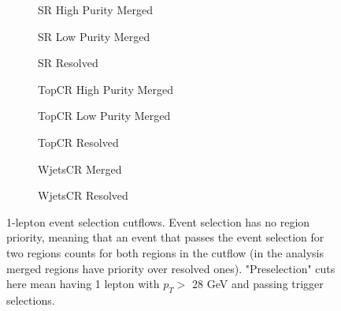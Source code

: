 \begin{figure}[ht]
    \centering
    \begin{subfigure}{\textwidth}
        \resizebox{\textwidth}{!}{}
        \caption{SR High Purity Merged}
    \end{subfigure}
    \begin{subfigure}{\textwidth}
        \resizebox{\textwidth}{!}{}
        \caption{SR Low Purity Merged}
    \end{subfigure}
    \begin{subfigure}{\textwidth}
        \resizebox{\textwidth}{!}{}
        \caption{SR Resolved}
    \end{subfigure}
    \begin{subfigure}{\textwidth}
        \resizebox{\textwidth}{!}{}
        \caption{TopCR High Purity Merged}
    \end{subfigure}
    \begin{subfigure}{\textwidth}
        \resizebox{\textwidth}{!}{}
        \caption{TopCR Low Purity Merged}
    \end{subfigure}
    \begin{subfigure}{\textwidth}
        \resizebox{\textwidth}{!}{}
        \caption{TopCR Resolved}
    \end{subfigure}
    \begin{subfigure}{\textwidth}
        \resizebox{\textwidth}{!}{}
        \caption{WjetsCR Merged}
    \end{subfigure}
    \begin{subfigure}{\textwidth}
        \resizebox{\textwidth}{!}{}
        \caption{WjetsCR Resolved}
    \end{subfigure}
    \caption{1-lepton event selection cutflows. Event selection has no region priority, meaning that an event that passes the event selection for two regions counts for both regions in the cutflow (in the analysis merged regions have priority over resolved ones). "Preselection" cuts here mean having 1 lepton with $p_T >$ 28 GeV and passing trigger selections.}
    \label{fig:1lepCutFlow}
\end{figure}

